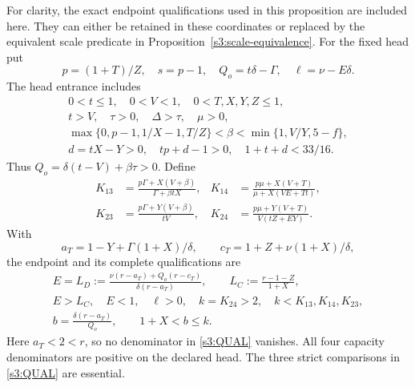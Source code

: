 \documentclass[11pt,reqno]{amsart}
\theoremstyle{definition}
\theoremstyle{remark}
\begin{document}
For clarity, the exact endpoint qualifications used in this proposition
are included here. They can either be retained in these coordinates or
replaced by the equivalent scale predicate in
Proposition~\ref{s3:scale-equivalence}. For the fixed head put
\[
 p=(1+T)/Z,\quad s=p-1,\quad
 Q_o=t\delta-\Gamma,\quad \ell=\nu-E\delta.
\]
The head entrance includes
\begin{equation}\label{s3:head-entrance}
\begin{gathered}
 0<t\le1,\quad0<V<1,\quad0<T,X,Y,Z\le1,\\
 t>V,\quad\tau>0,\quad\Delta>\tau,\quad\mu>0,\\
 \max\{0,p-1,1/X-1,T/Z\}<\beta<
 \min\{1,V/Y,5-f\},\\
 d=tX-Y>0,\quad tp+d-1>0,\quad1+t+d<33/16.
\end{gathered}
\end{equation}
Thus \(Q_o=\delta(t-V)+\beta\tau>0\).
Define
\begin{equation}\label{s3:four-capacities}
\begin{aligned}
 K_{13}&=\frac{p\Gamma+X(V+\beta)}{\Gamma+\beta tX},&
 K_{14}&=\frac{p\mu+X(V+T)}{\mu+X(VE+Tt)},\\
 K_{23}&=\frac{p\Gamma+Y(V+\beta)}{tV},&
 K_{24}&=\frac{p\mu+Y(V+T)}{V(tZ+EY)}.
\end{aligned}
\end{equation}
With
\[
 a_T=1-Y+\Gamma(1+X)/\delta,\qquad
 c_T=1+Z+\nu(1+X)/\delta,
\]
the endpoint and its complete qualifications are
\begin{equation}\label{s3:QUAL}
\begin{gathered}
 E=L_D:=\frac{\nu(r-a_T)+Q_o(r-c_T)}{\delta(r-a_T)},\qquad
 L_C:=\frac{r-1-Z}{1+X},\\
 E>L_C,\quad E<1,\quad\ell>0,\quad
 k=K_{24}>2,\quad k<K_{13},K_{14},K_{23},\\
 b=\frac{\delta(r-a_T)}{Q_o},\qquad 1+X<b\le k.
\end{gathered}
\end{equation}
Here \(a_T<2<r\), so no denominator in \eqref{s3:QUAL}
vanishes. All four capacity denominators are positive on the declared
head. The three strict comparisons in \eqref{s3:QUAL} are essential.
\end{document}
